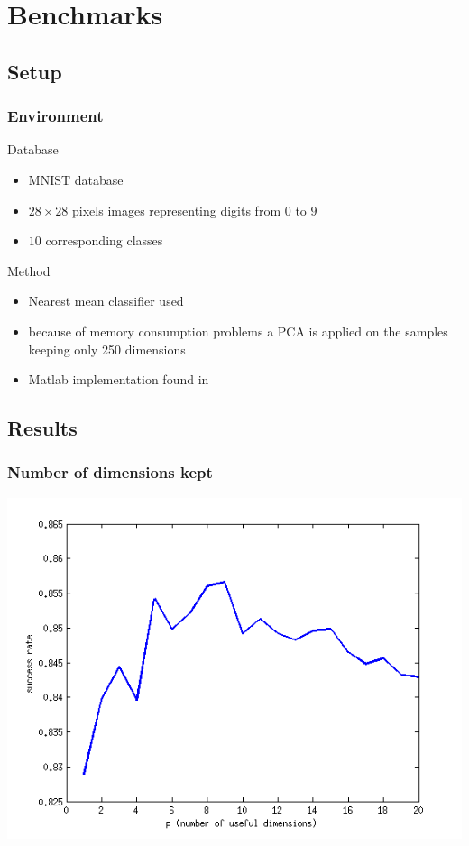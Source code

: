 \documentclass[smaller,pdf,svgnames]{beamer}
\begin{document}
\section{Benchmarks}

\subsection{Setup}

\begin{frame}
  \frametitle{Environment}

  \begin{block}{Database}
    \begin{itemize}
      \item MNIST database
      \item $28 \times 28$ pixels images representing digits from $0$ to $9$
      \item $10$ corresponding classes
    \end{itemize}
  \end{block}

  \begin{block}{Method}
    \begin{itemize}
      \item Nearest mean classifier used
      \item because of memory consumption problems a PCA is applied on the samples keeping only 250 dimensions
      \item Matlab implementation found in \cite{burget.2004}
    \end{itemize}
  \end{block}

\end{frame}

\subsection{Results}

\begin{frame}
  \frametitle{Number of dimensions kept}
  \centering\includegraphics[scale=0.70]{../img/bench-classes}
\end{frame}
\end{document}

